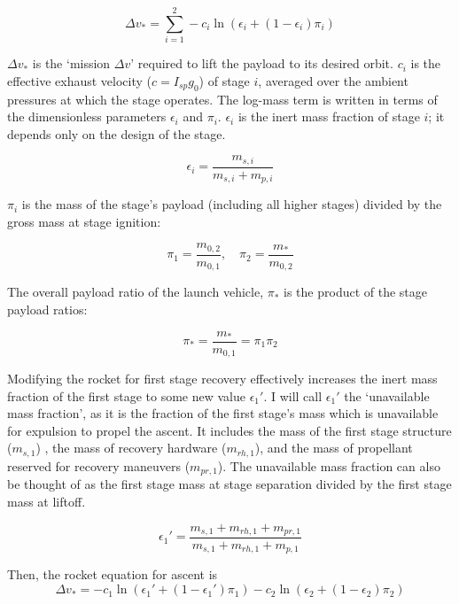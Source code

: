\documentclass[conf]{new-aiaa}
\begin{document}
\begin{equation}
\Delta v_* =  \sum_{i=1}^{2} - c_i \ln\left( \epsilon_i + (1 - \epsilon_i) \pi_i \right)
\end{equation} 

$\Delta v_*$ is the `mission $\Delta v$' required to lift the payload to its desired orbit. $c_i$ is the effective exhaust velocity ($c = I_{sp} g_0$) of stage $i$, averaged over the ambient pressures at which the stage operates. The log-mass term is written in terms of the dimensionless parameters $\epsilon_i$ and $\pi_i$. $\epsilon_i$ is the inert mass fraction of stage $i$; it depends only on the design of the stage.

\begin{equation}
\epsilon_i = \frac{m_{s,i}}{m_{s,i} + m_{p,i}}
\end{equation}

$\pi_i$ is the mass of the stage's payload (including all higher stages) divided by the gross mass at stage ignition:

\begin{equation}
\pi_1 = \frac{m_{0,2}}{m_{0,1}}, \quad \pi_2 = \frac{m_*}{m_{0,2}}
\end{equation}

The overall payload ratio of the launch vehicle, $\pi_*$ is the product of the stage payload ratios:

\begin{equation}
\label{eq:pi_star}
\pi_* = \frac{m_*}{m_{0,1}} = \pi_1 \pi_2
\end{equation} 

Modifying the rocket for first stage recovery effectively increases the inert mass fraction of the first stage to some new value $\epsilon_1'$. I will call $\epsilon_1'$ the `unavailable mass fraction', as it is the fraction of the first stage's mass which is unavailable for expulsion to propel the ascent. It includes the mass of the first stage structure ($m_{s,1}$) , the mass of recovery hardware ($m_{rh,1}$), and the mass of propellant reserved for recovery maneuvers ($m_{pr,1}$). The unavailable mass fraction can also be thought of as the first stage mass at stage separation divided by the first stage mass at liftoff.

\begin{equation}
\epsilon_1' = \frac{m_{s,1} + m_{rh,1} + m_{pr,1}}{m_{s,1} + m_{rh,1} + m_{p,1}}
\end{equation}

Then, the rocket equation for ascent is
\begin{equation}
\label{eq:recov_rocket}
\Delta v_* =  - c_1 \ln\left( \epsilon_1' + (1 - \epsilon_1') \pi_1 \right) - c_2 \ln\left( \epsilon_2 + (1 - \epsilon_2) \pi_2 \right)
\end{equation}
\end{document}
